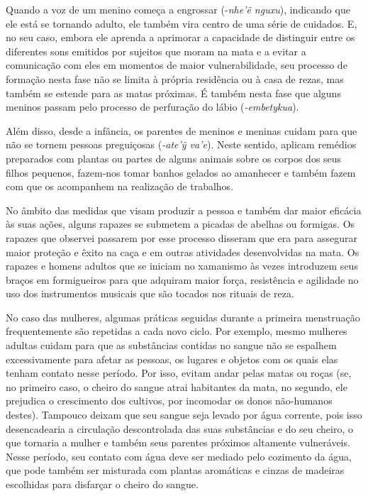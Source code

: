 Quando a voz de um menino começa a engrossar (-\emph{nhe'ẽ nguxu}),
indicando que ele está se tornando adulto, ele também vira centro de uma
série de cuidados. E, no seu caso, embora ele aprenda a aprimorar a
capacidade de distinguir entre os diferentes sons emitidos por sujeitos
que moram na mata e a evitar a comunicação com eles em momentos de maior
vulnerabilidade, seu processo de formação nesta fase não se limita à
própria residência ou à casa de rezas, mas também se estende para as
matas próximas. É também nesta fase que alguns meninos passam pelo
processo de perfuração do lábio (\emph{-embetykua}).

Além disso, desde a infância, os parentes de meninos e meninas cuidam
para que não se tornem pessoas preguiçosas (\emph{-ate'ỹ va'e}). Neste
sentido, aplicam remédios preparados com plantas ou partes de alguns
animais sobre os corpos dos seus filhos pequenos, fazem-nos tomar banhos
gelados ao amanhecer e também fazem com que os acompanhem na realização
de trabalhos.

No âmbito das medidas que visam produzir a pessoa e também dar maior
eficácia às suas ações, alguns rapazes se submetem a picadas de abelhas
ou formigas. Os rapazes que observei passarem por esse processo disseram
que era para assegurar maior proteção e êxito na caça e em outras
atividades desenvolvidas na mata. Os rapazes e homens adultos que se
iniciam no xamanismo às vezes introduzem seus braços em formigueiros
para que adquiram maior força, resistência e agilidade no uso dos
instrumentos musicais que são tocados nos rituais de reza.

No caso das mulheres, algumas práticas seguidas durante a primeira
menstruação frequentemente são repetidas a cada novo ciclo. Por exemplo,
mesmo mulheres adultas cuidam para que as substâncias contidas no sangue
não se espalhem excessivamente para afetar as pessoas, os lugares e
objetos com os quais elas tenham contato nesse período. Por isso, evitam
andar pelas matas ou roças (se, no primeiro caso, o cheiro do sangue
atrai habitantes da mata, no segundo, ele prejudica o crescimento dos
cultivos, por incomodar os donos não-humanos destes). Tampouco deixam
que seu sangue seja levado por água corrente, pois isso desencadearia a
circulação descontrolada das suas substâncias e do seu cheiro, o que
tornaria a mulher e também seus parentes próximos altamente vulneráveis.
Nesse período, seu contato com água deve ser mediado pelo cozimento da
água, que pode também ser misturada com plantas aromáticas e cinzas de
madeiras escolhidas para disfarçar o cheiro do sangue.

